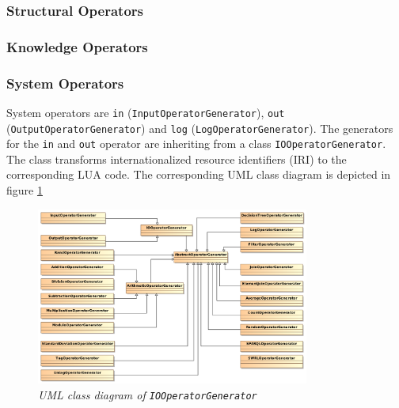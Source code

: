 \subsubsection{Structural Operators}

\subsubsection{Knowledge Operators}

\subsubsection{System Operators}
System operators are \texttt{in} (\texttt{InputOperatorGenerator}), 
\texttt{out} (\texttt{OutputOperatorGenerator}) and \texttt{log} 
(\texttt{LogOperatorGenerator}). The generators for the \texttt{in} and 
\texttt{out} operator are inheriting from a class \texttt{IOOperatorGenerator}.
The class transforms internationalized resource identifiers (IRI) to the 
corresponding LUA code. The corresponding UML class diagram is depicted in
figure \ref{fig:iooperatorgenerator} 
\begin{figure}[htpb]
  \centering
  \includegraphics[width=0.8\textwidth]{figures/overview}
  \caption{\emph{UML class diagram of \texttt{IOOperatorGenerator}}}
  \label{fig:iooperatorgenerator}
\end{figure}
